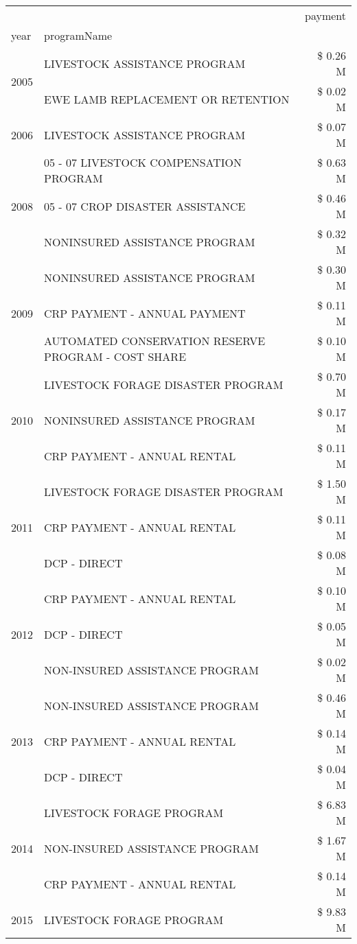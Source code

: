 \begin{tabular}{llr}
\toprule
 &  & payment \\
year & programName &  \\
\midrule
\multirow[t]{2}{*}{2005} & LIVESTOCK ASSISTANCE PROGRAM & \$ 0.26 M \\
 & EWE LAMB REPLACEMENT OR RETENTION & \$ 0.02 M \\
\cline{1-3}
2006 & LIVESTOCK ASSISTANCE PROGRAM & \$ 0.07 M \\
\cline{1-3}
\multirow[t]{3}{*}{2008} & 05 - 07 LIVESTOCK COMPENSATION PROGRAM & \$ 0.63 M \\
 & 05 - 07 CROP DISASTER ASSISTANCE & \$ 0.46 M \\
 & NONINSURED ASSISTANCE PROGRAM & \$ 0.32 M \\
\cline{1-3}
\multirow[t]{3}{*}{2009} & NONINSURED ASSISTANCE PROGRAM & \$ 0.30 M \\
 & CRP PAYMENT - ANNUAL PAYMENT & \$ 0.11 M \\
 & AUTOMATED CONSERVATION RESERVE PROGRAM - COST SHARE & \$ 0.10 M \\
\cline{1-3}
\multirow[t]{3}{*}{2010} & LIVESTOCK FORAGE DISASTER PROGRAM & \$ 0.70 M \\
 & NONINSURED ASSISTANCE PROGRAM & \$ 0.17 M \\
 & CRP PAYMENT - ANNUAL RENTAL & \$ 0.11 M \\
\cline{1-3}
\multirow[t]{3}{*}{2011} & LIVESTOCK FORAGE DISASTER PROGRAM & \$ 1.50 M \\
 & CRP PAYMENT - ANNUAL RENTAL & \$ 0.11 M \\
 & DCP - DIRECT & \$ 0.08 M \\
\cline{1-3}
\multirow[t]{3}{*}{2012} & CRP PAYMENT - ANNUAL RENTAL & \$ 0.10 M \\
 & DCP - DIRECT & \$ 0.05 M \\
 & NON-INSURED ASSISTANCE PROGRAM & \$ 0.02 M \\
\cline{1-3}
\multirow[t]{3}{*}{2013} & NON-INSURED ASSISTANCE PROGRAM & \$ 0.46 M \\
 & CRP PAYMENT - ANNUAL RENTAL & \$ 0.14 M \\
 & DCP - DIRECT & \$ 0.04 M \\
\cline{1-3}
\multirow[t]{3}{*}{2014} & LIVESTOCK FORAGE PROGRAM & \$ 6.83 M \\
 & NON-INSURED ASSISTANCE PROGRAM & \$ 1.67 M \\
 & CRP PAYMENT - ANNUAL RENTAL & \$ 0.14 M \\
\cline{1-3}
\multirow[t]{3}{*}{2015} & LIVESTOCK FORAGE PROGRAM & \$ 9.83 M \\

\end{tabular}
